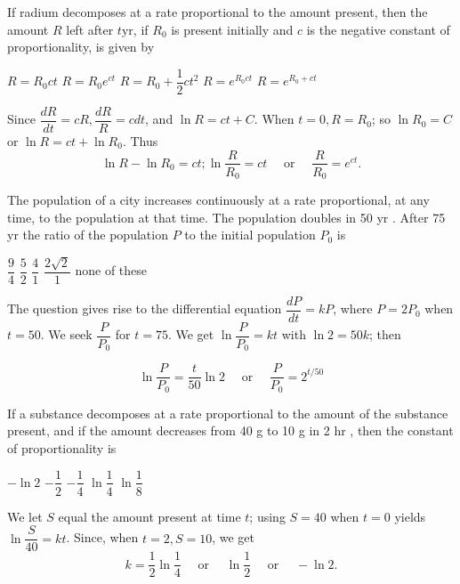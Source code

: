 \question
If radium decomposes at a rate proportional to the amount present, then the amount $R$ left after $t \mathrm{yr}$, if $R_{0}$ is present initially and $c$ is the negative constant of proportionality, is given by
\begin{choices}
  \choice $R=R_{0} c t$
  \CorrectChoice $R=R_{0} e^{c t}$
  \choice $R=R_{0}+\dfrac{1}{2} c t^{2}$
  \choice $R=e^{R_{0} c t}$
  \choice $R=e^{R_{0}+c t}$
\end{choices}
\begin{solution}
Since $\dfrac{d R}{d t}=c R, \dfrac{d R}{R}=c d t$, and $\ln R=c t+C$. When $t=0, R=R_{0}$; so $\ln R_{0}=C$ or $\ln R=c t+\ln R_{0}$. Thus
\[
\ln R-\ln R_{0}=c t ; \ln \dfrac{R}{R_{0}}=c t \quad \text { or } \quad \dfrac{R}{R_{0}}=e^{c t} .
\]
\end{solution}




\newpage



\question
The population of a city increases continuously at a rate proportional, at any time, to the population at that time. The population doubles in 50 yr . After 75 yr the ratio of the population $P$ to the initial population $P_{0}$ is
\begin{choices}
  \choice $\dfrac{9}{4}$
  \choice $\dfrac{5}{2}$
  \choice $\dfrac{4}{1}$
  \CorrectChoice $\dfrac{2 \sqrt{2}}{1}$
  \choice none of these
\end{choices}
\begin{solution}
The question gives rise to the differential equation $\dfrac{d P}{d t}=k P$, where $P=2 P_{0}$ when $t=50$. We seek $\dfrac{P}{P_{0}}$ for $t=75$. We get $\ln \dfrac{P}{P_{0}}=k t$ with $\ln 2=50 k$; then


\[
\ln \dfrac{P}{P_{0}}=\dfrac{t}{50} \ln 2 \quad \text { or } \quad \dfrac{P}{P_{0}}=2^{t / 50}
\]


\end{solution}

\question
If a substance decomposes at a rate proportional to the amount of the substance present, and if the amount decreases from 40 g to 10 g in 2 hr , then the constant of proportionality is
\begin{choices}
  \CorrectChoice $-\ln 2$
  \choice $-\dfrac{1}{2}$
  \choice $-\dfrac{1}{4}$
  \choice $\ln \dfrac{1}{4}$
  \choice $\ln \dfrac{1}{8}$
\end{choices}
\begin{solution}
We let $S$ equal the amount present at time $t$; using $S=40$ when $t=0$ yields $\ln \dfrac{S}{40}=k t$. Since, when $t=2, S=10$, we get
\[
k=\dfrac{1}{2} \ln \dfrac{1}{4} \quad \text { or } \quad \ln \dfrac{1}{2} \quad \text { or } \quad-\ln 2 .
\]
\end{solution}




